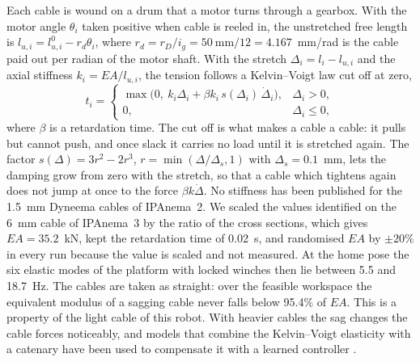 \documentclass{interact}
\begin{document}
Each cable is wound on a drum that a motor turns through a gearbox. With the motor angle $\theta_i$ taken positive when cable is reeled in, the unstretched free length is $l_{u,i}=l^0_{u,i}-r_d\theta_i$, where $r_d=r_D/i_g=50~\text{mm}/12=4.167$~mm/rad is the cable paid out per radian of the motor shaft. With the stretch $\Delta_i=l_i-l_{u,i}$ and the axial stiffness $k_i=EA/l_{u,i}$, the tension follows a Kelvin--Voigt law cut off at zero,
\begin{equation}\label{eq:tension}
t_i=\begin{cases}\max\!\big(0,\ k_i\Delta_i+\beta k_i\,s(\Delta_i)\,\dot\Delta_i\big),&\Delta_i>0,\\ 0,&\Delta_i\le0,\end{cases}
\end{equation}
where $\beta$ is a retardation time. The cut off is what makes a cable a cable: it pulls but cannot push, and once slack it carries no load until it is stretched again. The factor $s(\Delta)=3r^2-2r^3$, $r=\min(\Delta/\Delta_s,1)$ with $\Delta_s=0.1$~mm, lets the damping grow from zero with the stretch, so that a cable which tightens again does not jump at once to the force $\beta k\dot\Delta$. No stiffness has been published for the 1.5~mm Dyneema cables of IPAnema~2. We scaled the values identified on the 6~mm cable of IPAnema~3 \citep{tempel2015iftomm} by the ratio of the cross sections, which gives $EA=35.2$~kN, kept the retardation time of 0.02~s, and randomised $EA$ by $\pm20\%$ in every run because the value is scaled and not measured. At the home pose the six elastic modes of the platform with locked winches then lie between 5.5 and 18.7~Hz. The cables are taken as straight: over the feasible workspace the equivalent modulus of a sagging cable \citep{ernst1965} never falls below 95.4\% of $EA$. This is a property of the light cable of this robot. With heavier cables the sag changes the cable forces noticeably, and models that combine the Kelvin--Voigt elasticity with a catenary have been used to compensate it with a learned controller \citep{tachia2025sac}.
\end{document}
